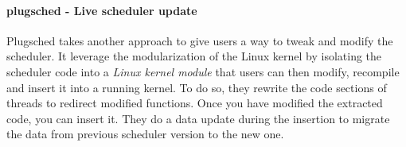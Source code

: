 


\paragraph{plugsched - Live scheduler update}
\par Plugsched takes another approach to give users a way to tweak and modify the scheduler. It leverage the modularization of the Linux kernel by isolating the scheduler code into a \textit{Linux kernel module} that users can then modify, recompile and insert it into a running kernel. To do so, they rewrite the code sections of threads to redirect modified functions. Once you have modified the extracted code, you can insert it. They do a data update during the insertion to migrate the data from previous scheduler version to the new one.

